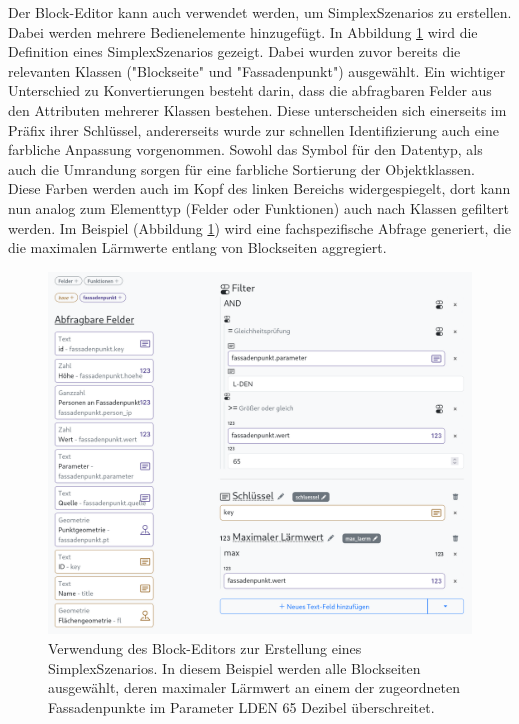 \pskip
Der Block-Editor kann auch verwendet werden, um SimplexSzenarios zu erstellen. Dabei werden mehrere Bedienelemente hinzugefügt. In Abbildung \ref{fig:buffet-scenario} wird die Definition eines SimplexSzenarios gezeigt. Dabei wurden zuvor bereits die relevanten Klassen ("Blockseite" und "Fassadenpunkt") ausgewählt. Ein wichtiger Unterschied zu Konvertierungen besteht darin, dass die abfragbaren Felder aus den Attributen mehrerer Klassen bestehen. Diese unterscheiden sich einerseits im Präfix ihrer Schlüssel, andererseits wurde zur schnellen Identifizierung auch eine farbliche Anpassung vorgenommen. Sowohl das Symbol für den Datentyp, als auch die Umrandung sorgen für eine farbliche Sortierung der Objektklassen. Diese Farben werden auch im Kopf des linken Bereichs widergespiegelt, dort kann nun analog zum Elementtyp (Felder oder Funktionen) auch nach Klassen gefiltert werden. Im Beispiel (Abbildung \ref{fig:buffet-scenario}) wird eine fachspezifische Abfrage generiert, die die maximalen Lärmwerte entlang von Blockseiten aggregiert.

\begin{figure}[ht]
  \begin{center}
    \includegraphics[width=.95\textwidth]{assets/lpz-scenario.png}
  \end{center}
  \caption[Verwendung des Block-Editors zur Erstellung eines SimplexSzenarios]{Verwendung des Block-Editors zur Erstellung eines SimplexSzenarios. In diesem Beispiel werden alle Blockseiten ausgewählt, deren maximaler Lärmwert an einem der zugeordneten Fassadenpunkte im Parameter \acf{LDEN} 65 Dezibel überschreitet.}
  \label{fig:buffet-scenario}
\end{figure}

